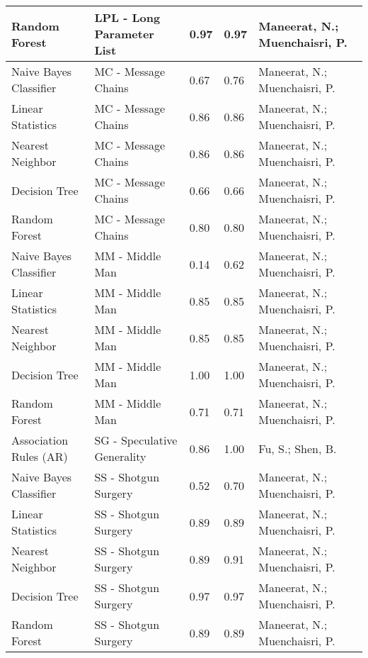 \begin{small}
\begin{longtable} {|p{}|p{}|l|l|p{}|}
Random Forest          & LPL - Long Parameter List   & 0.97    & 0.97 & Maneerat, N.; Muenchaisri, P.\\ \hline
Naive Bayes Classifier & MC - Message Chains         & 0.67    & 0.76 & Maneerat, N.; Muenchaisri, P.\\ \hline
Linear Statistics      & MC - Message Chains         & 0.86    & 0.86 & Maneerat, N.; Muenchaisri, P.\\ \hline
Nearest Neighbor       & MC - Message Chains         & 0.86    & 0.86 & Maneerat, N.; Muenchaisri, P.\\ \hline
Decision Tree          & MC - Message Chains         & 0.66    & 0.66 & Maneerat, N.; Muenchaisri, P.\\ \hline
Random Forest          & MC - Message Chains         & 0.80    & 0.80 & Maneerat, N.; Muenchaisri, P.\\ \hline
Naive Bayes Classifier & MM - Middle Man             & 0.14    & 0.62 & Maneerat, N.; Muenchaisri, P.\\ \hline
Linear Statistics      & MM - Middle Man             & 0.85    & 0.85 & Maneerat, N.; Muenchaisri, P.\\ \hline
Nearest Neighbor       & MM - Middle Man             & 0.85    & 0.85 & Maneerat, N.; Muenchaisri, P.\\ \hline
Decision Tree          & MM - Middle Man             & 1.00    & 1.00 & Maneerat, N.; Muenchaisri, P.\\ \hline
Random Forest          & MM - Middle Man             & 0.71    & 0.71 & Maneerat, N.; Muenchaisri, P.\\ \hline
Association Rules (AR) & SG - Speculative Generality & 0.86    & 1.00 & Fu, S.; Shen, B.\\ \hline
Naive Bayes Classifier & SS - Shotgun Surgery        & 0.52    & 0.70 & Maneerat, N.; Muenchaisri, P.\\ \hline
Linear Statistics      & SS - Shotgun Surgery        & 0.89    & 0.89 & Maneerat, N.; Muenchaisri, P.\\ \hline
Nearest Neighbor       & SS - Shotgun Surgery        & 0.89    & 0.91 & Maneerat, N.; Muenchaisri, P.\\ \hline
Decision Tree          & SS - Shotgun Surgery        & 0.97    & 0.97 & Maneerat, N.; Muenchaisri, P.\\ \hline
Random Forest          & SS - Shotgun Surgery        & 0.89    & 0.89 & Maneerat, N.; Muenchaisri, P.\\ \hline
\end{longtable}

\end{small}